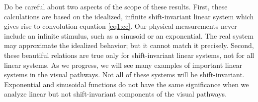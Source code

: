 Do be careful about two aspects of the scope of these results.
First, these calculations are based on the idealized, infinite
shift-invariant linear system which
gives rise to convolution equation \ref{eq1:cc}.
Our physical measurements
never include an infinite stimulus, 
such as a sinusoid or an exponential.
The real system may approximate
the idealized behavior;
but it cannot match it precisely.
Second,
these beautiful relations are true only for shift-invariant linear
systems, not for all linear systems.
As we progress,
we will see many examples of important linear systems in the
visual pathways.
Not all of these systems will be shift-invariant.
Exponential and sinusoidal functions do not have the
same significance when we analyze linear
but not shift-invariant components of the
visual pathways.



